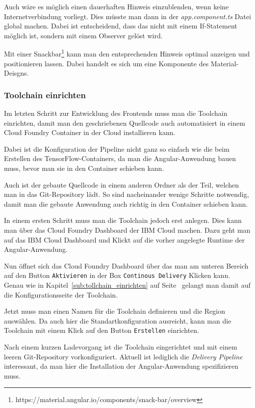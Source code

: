 Auch wäre es möglich einen dauerhaften Hinweis einzublenden, wenn keine Internetverbindung vorliegt. Dies müsste man
dann in der \textit{app.component.ts} Datei global machen. Dabei ist entscheidend, dass das nicht mit einem If-Statement
möglich ist, sondern mit einem Observer gelöst wird.

Mit einer Snackbar\footnote{https://material.angular.io/components/snack-bar/overview} kann man den entsprechenden
Hinweis optimal anzeigen und positionieren lassen. Dabei handelt es sich um eine Komponente des Material-Deisgns.

\subsubsection{Toolchain einrichten}
\label{subsec:toolchain_einrichten}
Im letzten Schritt zur Entwicklung des Frontends muss man die Toolchain einrichten, damit man den geschriebenen
Quellcode auch automatisiert in einem Cloud Foundry Container in der Cloud installieren kann.

Dabei ist die Konfiguration der Pipeline nicht ganz so einfach wie die beim Erstellen des TensorFlow-Containers, da man
die Angular-Anwendung bauen muss, bevor man sie in den Container schieben kann.

Auch ist der gebaute Quellcode in einem anderen Ordner als der Teil, welchen man in das Git-Repository lädt. So sind
nacheinander wenige Schritte notwendig, damit man die gebaute Anwendung auch richtig in den Container schieben kann.

In einem ersten Schritt muss man die Toolchain jedoch erst anlegen. Dies kann man über das Cloud Foundry Dashboard der
IBM Cloud machen. Dazu geht man auf das IBM Cloud Dashboard und Klickt auf die vorher angelegte Runtime der
Angular-Anwendung.

Nun öffnet sich das Cloud Foundry Dashboard über das man am unteren Bereich auf den Button \texttt{Aktivieren} in der
Box \texttt{Continous Delivery} Klicken kann. Genau wie in Kapitel~\ref{sub:tollchain_einrichten} auf
Seite~\pageref{sub:tollchain_einrichten} gelangt man damit auf die Konfigurationsseite der Toolchain.

Jetzt muss man einen Namen für die Toolchain definieren und die Region auswählen. Da auch hier die Standartkonfiguration
ausreicht, kann man die Toolchain mit einem Klick auf den Button \texttt{Erstellen} einrichten.

Nach einem kurzen Ladevorgang ist die Toolchain eingerichtet und mit einem leeren Git-Repository vorkonfiguriert.
Aktuell ist lediglich die \textit{Delivery Pipeline} interessant, da man hier die Installation der Angular-Anwendung
spezifizieren muss.

